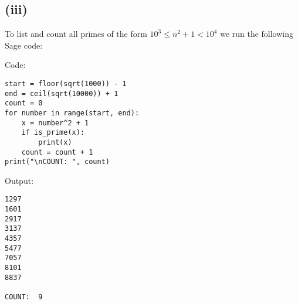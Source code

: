 \documentclass{article}
\theoremstyle{definition}
\begin{document}
\subsection*{(iii)}
To list and count all primes of the form $10^3 \leqslant n^2 + 1 < 10^4$  we run the
following Sage code:
\begin{mdframed}
    Code:
    \begin{verbatim}
start = floor(sqrt(1000)) - 1
end = ceil(sqrt(10000)) + 1
count = 0
for number in range(start, end):
    x = number^2 + 1
    if is_prime(x):
        print(x)
    count = count + 1
print("\nCOUNT: ", count)
    \end{verbatim}
    Output:
    \begin{verbatim}
1297
1601
2917
3137
4357
5477
7057
8101
8837

COUNT:  9
    \end{verbatim}
\end{mdframed}
\end{document}
